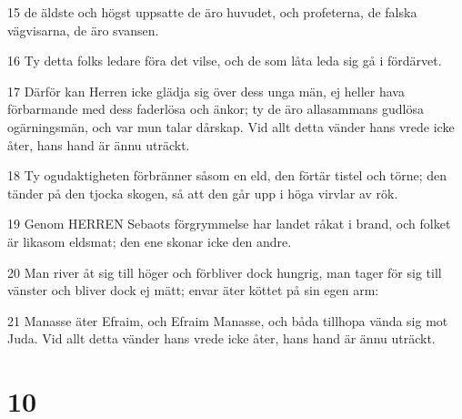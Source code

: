 \par 15 de äldste och högst uppsatte de äro huvudet, och profeterna, de falska vägvisarna, de äro svansen.
\par 16 Ty detta folks ledare föra det vilse, och de som låta leda sig gå i fördärvet.
\par 17 Därför kan Herren icke glädja sig över dess unga män, ej heller hava förbarmande med dess faderlösa och änkor; ty de äro allasammans gudlösa ogärningsmän, och var mun talar dårskap. Vid allt detta vänder hans vrede icke åter, hans hand är ännu uträckt.
\par 18 Ty ogudaktigheten förbränner såsom en eld, den förtär tistel och törne; den tänder på den tjocka skogen, så att den går upp i höga virvlar av rök.
\par 19 Genom HERREN Sebaots förgrymmelse har landet råkat i brand, och folket är likasom eldsmat; den ene skonar icke den andre.
\par 20 Man river åt sig till höger och förbliver dock hungrig, man tager för sig till vänster och bliver dock ej mätt; envar äter köttet på sin egen arm:
\par 21 Manasse äter Efraim, och Efraim Manasse, och båda tillhopa vända sig mot Juda. Vid allt detta vänder hans vrede icke åter, hans hand är ännu uträckt.

\chapter{10}

